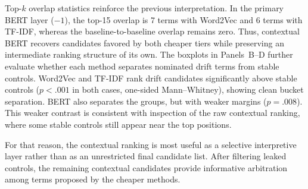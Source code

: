 \documentclass[12pt]{article}
\begin{document}
Top-$k$ overlap statistics reinforce the previous interpretation. In the primary BERT layer ($-1$),
the top-15 overlap is 7 terms with Word2Vec and 6 terms with TF-IDF, whereas the
baseline-to-baseline overlap remains zero. Thus, contextual BERT recovers candidates favored by both cheaper tiers while preserving an intermediate ranking structure of its own. %
The boxplots in Panels~B--D further evaluate whether each method separates nominated drift terms from stable controls. Word2Vec and TF-IDF rank drift candidates significantly above stable controls ($p < .001$ in both cases, one-sided Mann--Whitney), showing clean bucket separation. BERT also separates the groups, but with weaker margins ($p = .008$). This weaker contrast is consistent with inspection of the raw contextual ranking, where some stable controls still appear near the top positions.

For that reason, the contextual ranking is most useful as a selective interpretive layer rather than as an unrestricted final candidate list. After filtering leaked controls, the remaining contextual candidates provide informative arbitration among terms proposed by the cheaper methods.
\end{document}
